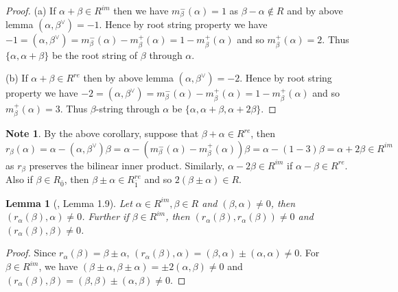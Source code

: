 \documentclass[11pt]{amsart}
\theoremstyle{plain}
\newtheorem{lemma}[thm]{Lemma}
\theoremstyle{definition}
\newtheorem{nt}[thm]{Note}
\numberwithin{equation}{section}
\newcommand{\al}{\alpha}
\newcommand{\be}{\beta}
\begin{document}
	\begin{proof}
		(a) If $\al+\be\in R^{im}$ then we have $m_{\be}^-(\al)=1$ as $\be-\al\notin R$ and by above lemma $(\al,\be^{\vee})=-1$. Hence by root string property we have $-1=(\al,\be^{\vee})=m_{\be}^-(\al)-m_{\be}^+(\al)=1-m_{\be}^+(\al)$ and so $m_{\be}^+(\al)=2$. Thus $\{\al,\al+\be\}$ be the root string of $\be$ through $\al$.
		
		(b) If $\al+\be\in R^{re}$ then by above lemma $(\al,\be^{\vee})=-2$. Hence by root string property we have $-2=(\al,\be^{\vee})=m_{\be}^-(\al)-m_{\be}^+(\al)=1-m_{\be}^+(\al)$ and so $m_{\be}^+(\al)=3$. Thus $\be$-string through $\al$ be $\{\al,\al+\be,\al+2\be\}$.
	\end{proof}
	\begin{nt}\label{nt1}
		By the above corollary, suppose that $\be+\al\in R^{re}$, then $r_{\be}(\al)=\al-(\al,\be^{\vee})\be=\al-(m_{\be}^-(\al)-m_{\be}^+(\al))\be=\al-(1-3)\be=\al+2\be\in R^{im}$ as $r_{\be}$ preserves the bilinear inner product. Similarly, $\al-2\be\in R^{im}$ if $\al-\be\in R^{re}$. Also if $\be\in R_{\bar{0}}$, then $\be\pm\al\in R_{\bar{1}}^{re}$ and so $2(\be\pm\al)\in R$.
	\end{nt}
	\begin{lemma}[\cite{serganova1996generalizations}, Lemma 1.9]\label{lem1} Let $\al\in R^{im}, \be\in R$ and $(\beta,\al)\neq 0$, then $(r_{\al}(\beta),\al)\neq 0$. Further if $\be\in R^{im}$, then $(r_{\al}(\beta),r_{\al}(\beta))\neq 0$ and $(r_{\al}(\be),\be)\neq0$.
	\end{lemma}
	\begin{proof} Since $r_{\al}(\be)=\be\pm\al$, $(r_{\al}(\beta),\al)=(\be,\al)\pm(\al,\al)\neq 0$. For $\be\in R^{im}$, we have $(\be\pm\al,\be\pm\al)=\pm2(\al,\be)\neq 0$ and $(r_{\al}(\beta),\be)=(\be,\be)\pm(\al,\be)\neq 0$.
	\end{proof}	
	
\end{document}
